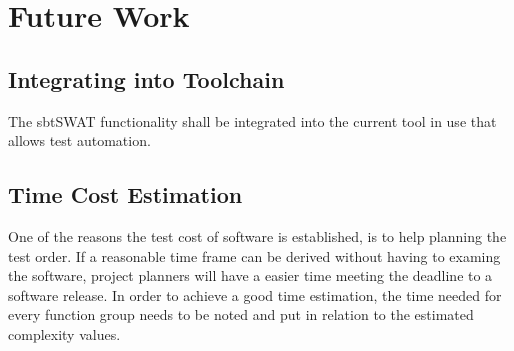 \section{Future Work}

\subsection{Integrating into Toolchain}

The sbtSWAT functionality shall be integrated into the current tool in use that allows test automation.

\subsection{Time Cost Estimation}

One of the reasons the test cost of software is established, is to help planning the test order. If a reasonable time frame can be derived without having to examing the software, project planners will have a easier time meeting the deadline to a software release. In order to achieve a good time estimation, the time needed for every function group needs to be noted and put in relation to the estimated complexity values.